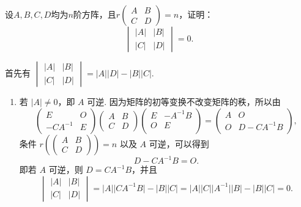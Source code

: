 \begin{exercise}
\begin{exgroup}
        \item 设$A,B,C,D$均为$n$阶方阵，且$r\begin{pmatrix}
                A & B \\ C & D
            \end{pmatrix}=n$，证明：
        \[\begin{vmatrix}
                |A| & |B| \\ |C| & |D|
            \end{vmatrix} = 0.\]
        \begin{answer}
            首先有 $\begin{vmatrix}
                \lvert A \rvert & \lvert B \rvert \\
                \lvert C \rvert & \lvert D \rvert
            \end{vmatrix} = \lvert A \rvert \lvert D \rvert-\lvert B \rvert \lvert C \rvert$.
            \begin{enumerate}
                \item 若 $\lvert A \rvert \neq 0$，即 $A$ 可逆. 因为矩阵的初等变换不改变矩阵的秩，所以由
                    \[\begin{pmatrix}
                            E        & O \\
                            -CA^{-1} & E
                        \end{pmatrix} \begin{pmatrix}
                            A & B \\
                            C & D
                        \end{pmatrix} \begin{pmatrix}
                            E & -A^{-1}B \\
                            O & E        \\
                        \end{pmatrix} = \begin{pmatrix}
                            A & O          \\
                            O & D-CA^{-1}B
                        \end{pmatrix},\]
                    条件 $r\left(\begin{pmatrix}
                                A & B \\
                                C & D
                            \end{pmatrix}\right) = n$ 以及 $A$ 可逆，可以得到
                    \[D-CA^{-1}B = O.\]
                    即若 $A$ 可逆，则 $D = CA^{-1}B$，并且
                    \[\begin{vmatrix}
                            \lvert A \rvert & \lvert B \rvert \\
                            \lvert C \rvert & \lvert D \rvert
                        \end{vmatrix} = \lvert A \rvert \lvert CA^{-1}B \rvert-\lvert B \rvert \lvert C \rvert = \lvert A \rvert \lvert C \rvert \lvert A^{-1} \rvert \lvert B \rvert-\lvert B \rvert \lvert C \rvert = 0.\]


\end{enumerate}
\end{answer}
\end{exgroup}
\end{exercise}
